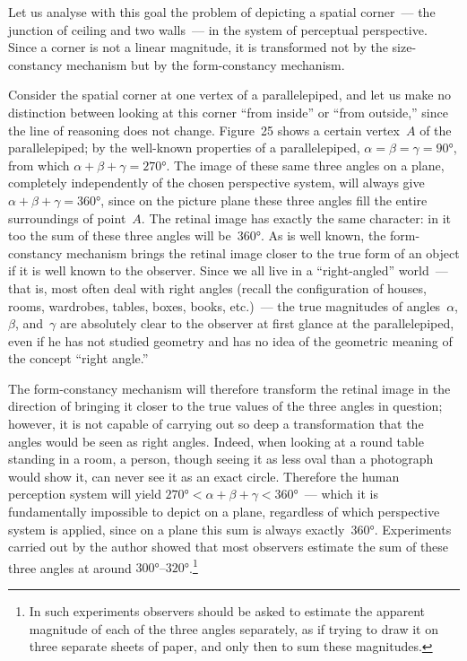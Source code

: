 Let us analyse with this goal the problem of depicting a spatial corner~--- the junction
of ceiling and two walls~--- in the system of perceptual perspective.  Since a corner is
not a linear magnitude, it is transformed not by the size-constancy mechanism but by
the form-constancy mechanism.

Consider the spatial corner at one vertex of a parallelepiped, and let us make no
distinction between looking at this corner ``from inside'' or ``from outside,'' since
the line of reasoning does not change.  Figure~25 shows a certain vertex~$A$ of the
parallelepiped; by the well-known properties of a parallelepiped,
$\alpha = \beta = \gamma = 90°$, from which $\alpha + \beta + \gamma = 270°$.  The
image of these same three angles on a plane, completely independently of the chosen
perspective system, will always give $\alpha + \beta + \gamma = 360°$, since on the
picture plane these three angles fill the entire surroundings of point~$A$.  The retinal
image has exactly the same character: in it too the sum of these three angles will
be~$360°$.  As is well known, the form-constancy mechanism brings the retinal image
closer to the true form of an object if it is well known to the observer.  Since we all
live in a ``right-angled'' world~--- that is, most often deal with right angles (recall the
configuration of houses, rooms, wardrobes, tables, boxes, books, etc.)~--- the true
magnitudes of angles~$\alpha$, $\beta$, and~$\gamma$ are absolutely clear to the
observer at first glance at the parallelepiped, even if he has not studied geometry and
has no idea of the geometric meaning of the concept ``right angle.''


The form-constancy mechanism will therefore transform the retinal image in the
direction of bringing it closer to the true values of the three angles in question; however,
it is not capable of carrying out so deep a transformation that the angles would be seen
as right angles.  Indeed, when looking at a round table standing in a room, a person,
though seeing it as less oval than a photograph would show it, can never see it as an
exact circle.  Therefore the human perception system will yield
$270° < \alpha + \beta + \gamma < 360°$~--- which it is fundamentally impossible to
depict on a plane, regardless of which perspective system is applied, since on a plane
this sum is always exactly~$360°$.  Experiments carried out by the author showed that
most observers estimate the sum of these three angles at around
$300°\text{--}320°$.\footnote{%
  In such experiments observers should be asked to estimate the apparent magnitude
  of each of the three angles separately, as if trying to draw it on three separate sheets
  of paper, and only then to sum these magnitudes.}

